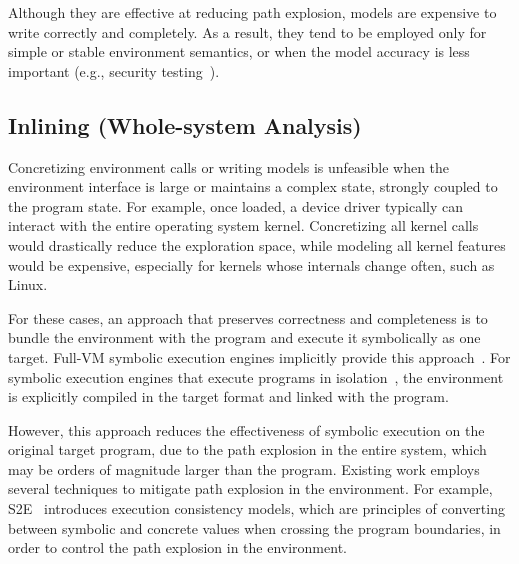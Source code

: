 Although they are effective at reducing path explosion, models are expensive to write correctly and completely.  As a result, they tend to be employed only for simple or stable environment semantics, or when the model accuracy is less important (e.g., security testing~\cite{aeg}).


\subsection{Inlining (Whole-system Analysis)}

Concretizing environment calls or writing models is unfeasible when the environment interface is large or maintains a complex state, strongly coupled to the program state.
%
For example, once loaded, a device driver typically can interact with the entire operating system kernel.  Concretizing all kernel calls would drastically reduce the exploration space, while modeling all kernel features would be expensive, especially for kernels whose internals change often, such as Linux.

For these cases, an approach that preserves correctness and completeness is to bundle the environment with the program and execute it symbolically as one target.
%
Full-VM symbolic execution engines implicitly provide this approach~\cite{s2e,bitBlaze}.
%
For symbolic execution engines that execute programs in isolation~\cite{klee,godefroid:fuzz}, the environment is explicitly compiled in the target format and linked with the program.

However, this approach reduces the effectiveness of symbolic execution on the original target program, due to the path explosion in the entire system, which may be orders of magnitude larger than the program.
%
Existing work employs several techniques to mitigate path explosion in the environment.
%
For example, S2E~\cite{s2e} introduces execution consistency models, which are principles of converting between symbolic and concrete values when crossing the program boundaries, in order to control the path explosion in the environment.

